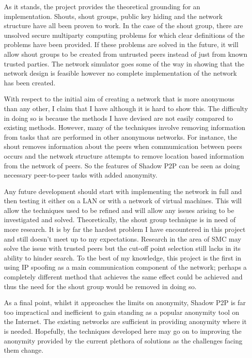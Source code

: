 \documentclass[ %
                    author={Luke Murray},
                supervisor={Dr. Simon Hollis},
                     title={Shadow Peer-to-Peer Networks},
                  subtitle={},
                    degree={MEng},
                      year={2013} ]{thesis}
\begin{document}
As it stands, the project provides the theoretical grounding for an implementation. Shouts, shout groups, public key hiding and the network structure have all been proven to work. In the case of the shout group, there are unsolved secure multiparty computing problems for which clear definitions of the problems have been provided. If these problems are solved in the future, it will allow shout groups to be created from untrusted peers instead of just from known trusted parties. The network simulator goes some of the way in showing that the network design is feasible however no complete implementation of the network has been created.

With respect to the initial aim of creating a network that is more anonymous than any other, I claim that I have although it is hard to show this. The difficulty in doing so is because the methods I have devised are not easily compared to existing methods. However, many of the techniques involve removing information from tasks that are performed in other anonymous networks. For instance, the shout removes information about the peers when commumication between peers occurs and the network structure attempts to remove location based information from the network of peers. So the features of Shadow P2P can be seen as doing necessary peer-to-peer tasks with added anonymity.

Any future development should start with implementing the network in full and then testing it either on a LAN or with a network of virtual machines. This will allow the techniques used to be refined and will allow any issues arising to be investigated and solved. Theoretically, the shout group technique is in need of more research. It is by far the hardest problem I have encountered in this project and still doesn't meet up to my expectations. Research in the area of SMC may solve the issue with trusted peers but the cut-off point selection still lacks in its ability to hinder search. To the best of my knowledge, this project is the first in using IP spoofing as a main communication component of the network; perhaps a completely different method that achieves the same effect could be achieved and thus the need for the shout group would be removed in doing so.

As a final point, whilst it approaches the limits on anonymity, Shadow P2P is far too impractical and inefficient to gain standing as a popular anonymity tool on the Internet. The existing networks are sufficient in providing anonymity where it is needed. Hopefully, the techniques developed here may go on to improving the anonymity provided by the current plethora of solutions as the challenges facing them change.
\end{document}
